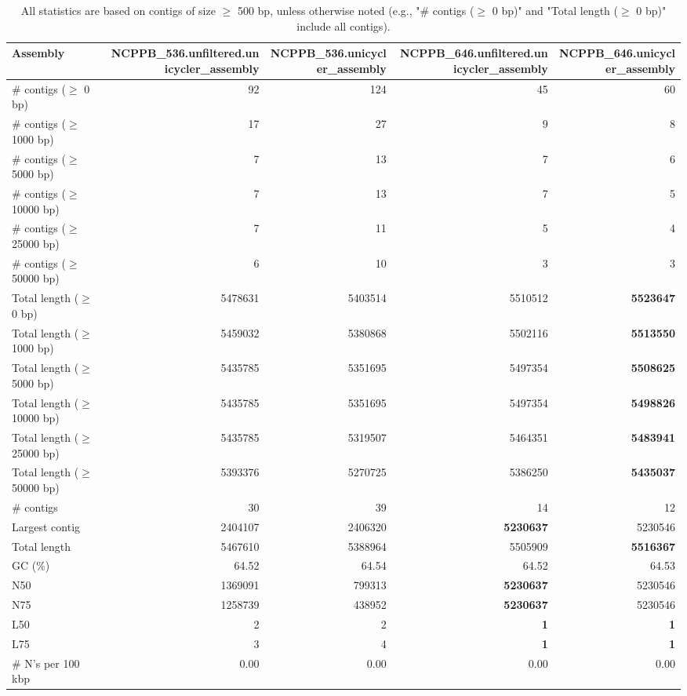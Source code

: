 \documentclass[12pt,a4paper]{article}
\begin{document}
\begin{table}[ht]
\begin{center}
\caption{All statistics are based on contigs of size $\geq$ 500 bp, unless otherwise noted (e.g., "\# contigs ($\geq$ 0 bp)" and "Total length ($\geq$ 0 bp)" include all contigs).}
\begin{tabular}{|l*{4}{|r}|}
\hline
Assembly & NCPPB\_536.unfiltered.unicycler\_assembly & NCPPB\_536.unicycler\_assembly & NCPPB\_646.unfiltered.unicycler\_assembly & NCPPB\_646.unicycler\_assembly \\ \hline
\# contigs ($\geq$ 0 bp) & 92 & 124 & 45 & 60 \\ \hline
\# contigs ($\geq$ 1000 bp) & 17 & 27 & 9 & 8 \\ \hline
\# contigs ($\geq$ 5000 bp) & 7 & 13 & 7 & 6 \\ \hline
\# contigs ($\geq$ 10000 bp) & 7 & 13 & 7 & 5 \\ \hline
\# contigs ($\geq$ 25000 bp) & 7 & 11 & 5 & 4 \\ \hline
\# contigs ($\geq$ 50000 bp) & 6 & 10 & 3 & 3 \\ \hline
Total length ($\geq$ 0 bp) & 5478631 & 5403514 & 5510512 & {\bf 5523647} \\ \hline
Total length ($\geq$ 1000 bp) & 5459032 & 5380868 & 5502116 & {\bf 5513550} \\ \hline
Total length ($\geq$ 5000 bp) & 5435785 & 5351695 & 5497354 & {\bf 5508625} \\ \hline
Total length ($\geq$ 10000 bp) & 5435785 & 5351695 & 5497354 & {\bf 5498826} \\ \hline
Total length ($\geq$ 25000 bp) & 5435785 & 5319507 & 5464351 & {\bf 5483941} \\ \hline
Total length ($\geq$ 50000 bp) & 5393376 & 5270725 & 5386250 & {\bf 5435037} \\ \hline
\# contigs & 30 & 39 & 14 & 12 \\ \hline
Largest contig & 2404107 & 2406320 & {\bf 5230637} & 5230546 \\ \hline
Total length & 5467610 & 5388964 & 5505909 & {\bf 5516367} \\ \hline
GC (\%) & 64.52 & 64.54 & 64.52 & 64.53 \\ \hline
N50 & 1369091 & 799313 & {\bf 5230637} & 5230546 \\ \hline
N75 & 1258739 & 438952 & {\bf 5230637} & 5230546 \\ \hline
L50 & 2 & 2 & {\bf 1} & {\bf 1} \\ \hline
L75 & 3 & 4 & {\bf 1} & {\bf 1} \\ \hline
\# N's per 100 kbp & 0.00 & 0.00 & 0.00 & 0.00 \\ \hline
\end{tabular}
\end{center}
\end{table}
\end{document}
